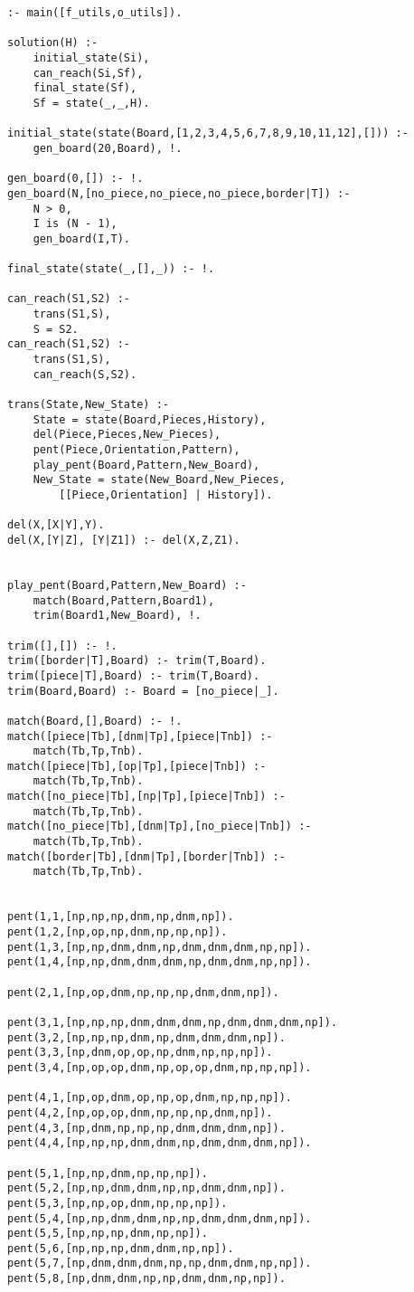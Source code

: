 \begin{verbatim}
:- main([f_utils,o_utils]).

solution(H) :-
	initial_state(Si),
	can_reach(Si,Sf),
	final_state(Sf),
	Sf = state(_,_,H).

initial_state(state(Board,[1,2,3,4,5,6,7,8,9,10,11,12],[])) :-
	gen_board(20,Board), !.

gen_board(0,[]) :- !.
gen_board(N,[no_piece,no_piece,no_piece,border|T]) :-
	N > 0,
	I is (N - 1),
	gen_board(I,T).

final_state(state(_,[],_)) :- !.

can_reach(S1,S2) :-
	trans(S1,S),
	S = S2.
can_reach(S1,S2) :-
	trans(S1,S),
	can_reach(S,S2).

trans(State,New_State) :-
	State = state(Board,Pieces,History),
	del(Piece,Pieces,New_Pieces),
	pent(Piece,Orientation,Pattern),
	play_pent(Board,Pattern,New_Board),
	New_State = state(New_Board,New_Pieces,
		[[Piece,Orientation] | History]).

del(X,[X|Y],Y).
del(X,[Y|Z], [Y|Z1]) :- del(X,Z,Z1).


play_pent(Board,Pattern,New_Board) :-
	match(Board,Pattern,Board1),
	trim(Board1,New_Board), !.

trim([],[]) :- !.
trim([border|T],Board) :- trim(T,Board).
trim([piece|T],Board) :- trim(T,Board).
trim(Board,Board) :- Board = [no_piece|_].

match(Board,[],Board) :- !.
match([piece|Tb],[dnm|Tp],[piece|Tnb]) :-
	match(Tb,Tp,Tnb).
match([piece|Tb],[op|Tp],[piece|Tnb]) :-
	match(Tb,Tp,Tnb).
match([no_piece|Tb],[np|Tp],[piece|Tnb]) :-
	match(Tb,Tp,Tnb).
match([no_piece|Tb],[dnm|Tp],[no_piece|Tnb]) :-
	match(Tb,Tp,Tnb).
match([border|Tb],[dnm|Tp],[border|Tnb]) :-
	match(Tb,Tp,Tnb).


pent(1,1,[np,np,np,dnm,np,dnm,np]).
pent(1,2,[np,op,np,dnm,np,np,np]).
pent(1,3,[np,np,dnm,dnm,np,dnm,dnm,dnm,np,np]).
pent(1,4,[np,np,dnm,dnm,dnm,np,dnm,dnm,np,np]).

pent(2,1,[np,op,dnm,np,np,np,dnm,dnm,np]).

pent(3,1,[np,np,np,dnm,dnm,dnm,np,dnm,dnm,dnm,np]).
pent(3,2,[np,np,np,dnm,np,dnm,dnm,dnm,np]).
pent(3,3,[np,dnm,op,op,np,dnm,np,np,np]).
pent(3,4,[np,op,op,dnm,np,op,op,dnm,np,np,np]).

pent(4,1,[np,op,dnm,op,np,op,dnm,np,np,np]).
pent(4,2,[np,op,op,dnm,np,np,np,dnm,np]).
pent(4,3,[np,dnm,np,np,np,dnm,dnm,dnm,np]).
pent(4,4,[np,np,np,dnm,dnm,np,dnm,dnm,dnm,np]).

pent(5,1,[np,np,dnm,np,np,np]).
pent(5,2,[np,np,dnm,dnm,np,np,dnm,dnm,np]).
pent(5,3,[np,np,op,dnm,np,np,np]).
pent(5,4,[np,np,dnm,dnm,np,np,dnm,dnm,dnm,np]).
pent(5,5,[np,np,np,dnm,np,np]).
pent(5,6,[np,np,np,dnm,dnm,np,np]).
pent(5,7,[np,dnm,dnm,dnm,np,np,dnm,dnm,np,np]).
pent(5,8,[np,dnm,dnm,np,np,dnm,dnm,np,np]).


\end{verbatim}
